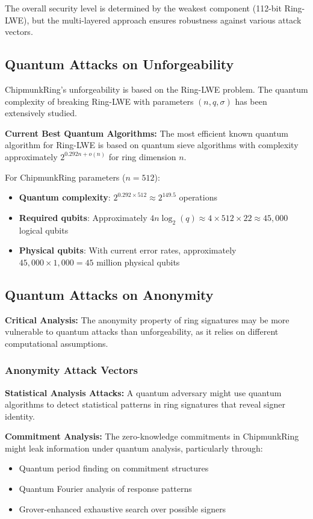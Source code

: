 \documentclass[11pt,a4paper]{article}
\begin{document}
The overall security level is determined by the weakest component (112-bit Ring-LWE), but the multi-layered approach ensures robustness against various attack vectors.

\subsection{Quantum Attacks on Unforgeability}

ChipmunkRing's unforgeability is based on the Ring-LWE problem. The quantum complexity of breaking Ring-LWE with parameters $(n, q, \sigma)$ has been extensively studied.

\textbf{Current Best Quantum Algorithms:} The most efficient known quantum algorithm for Ring-LWE is based on quantum sieve algorithms with complexity approximately $2^{0.292n + o(n)}$ for ring dimension $n$.

For ChipmunkRing parameters ($n = 512$):
\begin{itemize}
\item \textbf{Quantum complexity}: $2^{0.292 \times 512} \approx 2^{149.5}$ operations
\item \textbf{Required qubits}: Approximately $4n \log_2(q) \approx 4 \times 512 \times 22 \approx 45,000$ logical qubits
\item \textbf{Physical qubits}: With current error rates, approximately $45,000 \times 1,000 = 45$ million physical qubits
\end{itemize}

\subsection{Quantum Attacks on Anonymity}

\textbf{Critical Analysis:} The anonymity property of ring signatures may be more vulnerable to quantum attacks than unforgeability, as it relies on different computational assumptions.

\subsubsection{Anonymity Attack Vectors}

\textbf{Statistical Analysis Attacks:} A quantum adversary might use quantum algorithms to detect statistical patterns in ring signatures that reveal signer identity.

\textbf{Commitment Analysis:} The zero-knowledge commitments in ChipmunkRing might leak information under quantum analysis, particularly through:
\begin{itemize}
\item Quantum period finding on commitment structures
\item Quantum Fourier analysis of response patterns  
\item Grover-enhanced exhaustive search over possible signers
\end{itemize}
\end{document}

